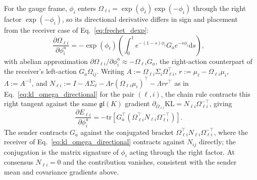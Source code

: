 \documentclass[11pt]{article}
\begin{document}
For the gauge frame, $\phi_i$ enters $\Omega_{\ell i} = \exp(\phi_\ell)\exp(-\phi_i)$ through the right factor $\exp(-\phi_i)$, so its directional derivative differs in sign and placement from the receiver case of Eq.~\eqref{eq:frechet_dexp}:
\begin{equation}
\frac{\partial \Omega_{\ell i}}{\partial \phi_i^a} = -\exp(\phi_\ell)\left(\int_0^1 e^{-(1-s)\phi_i} G_a e^{-s\phi_i} \mathrm{d}s\right),
\label{eq:frechet_dexp_sender}
\end{equation}
with abelian approximation $\partial \Omega_{\ell i}/\partial \phi_i^a \approx -\Omega_{\ell i} G_a$, the right-action counterpart of the receiver's left-action $G_a\Omega_{ij}$. Writing $A := \Omega_{\ell i}\Sigma_i\Omega_{\ell i}^\top$, $r := \mu_\ell - \Omega_{\ell i}\mu_i$, $\Lambda := A^{-1}$, and $N_{\ell i} := I - \Lambda\Sigma_\ell - \Lambda r(\Omega_{\ell i}\mu_i)^\top - \Lambda r r^\top$ as in Eq.~\eqref{eq:kl_omega_directional} for the pair $(\ell, i)$, the chain rule contracts this right tangent against the same $\mathfrak{gl}(K)$ gradient $\partial_{\Omega_{\ell i}}\mathrm{KL} = N_{\ell i}\Omega_{\ell i}^{-\top}$, giving
\begin{equation}
\frac{\partial E_{\ell i}}{\partial \phi_i^a} = -\mathrm{tr}\left[G_a^\top\left(\Omega_{\ell i}^\top N_{\ell i} \Omega_{\ell i}^{-\top}\right)\right].
\label{eq:sender_phi_gradient}
\end{equation}
The sender contracts $G_a$ against the conjugated bracket $\Omega_{\ell i}^\top N_{\ell i}\Omega_{\ell i}^{-\top}$, where the receiver of Eq.~\eqref{eq:kl_omega_directional} contracts against $N_{ij}$ directly; the conjugation is the matrix signature of $\phi_i$ acting through the right factor. At consensus $N_{\ell i} = 0$ and the contribution vanishes, consistent with the sender mean and covariance gradients above.
\end{document}
